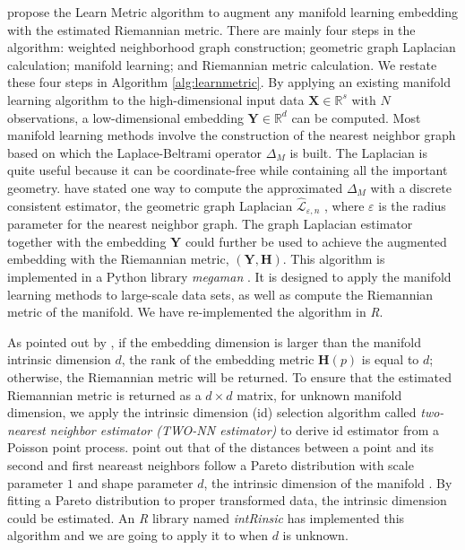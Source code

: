 \documentclass[11pt,a4paper,]{article}
\begin{document}
\textcite{Perrault-Joncas2013-pq} propose the Learn Metric algorithm to augment any manifold learning embedding with the estimated Riemannian metric. There are mainly four steps in the algorithm: weighted neighborhood graph construction; geometric graph Laplacian calculation; manifold learning; and Riemannian metric calculation. We restate these four steps in Algorithm \ref{alg:learnmetric}.
By applying an existing manifold learning algorithm to the high-dimensional input data \(\pmb{X}\in \mathbb{R}^s\) with \(N\) observations, a low-dimensional embedding \(\pmb{Y} \in \mathbb{R}^d\) can be computed. Most manifold learning methods involve the construction of the nearest neighbor graph based on which the Laplace-Beltrami operator \(\Delta_M\) is built. The Laplacian is quite useful because it can be coordinate-free while containing all the important geometry.
\textcite{Perrault-Joncas2013-pq} have stated one way to compute the approximated \(\Delta_M\) with a discrete consistent estimator, the geometric graph Laplacian \(\hat{\mathcal{L}}_{\varepsilon,n}\) \autocite{Zhou2011-za}, where \(\varepsilon\) is the radius parameter for the nearest neighbor graph.
The graph Laplacian estimator together with the embedding \(\pmb{Y}\) could further be used to achieve the augmented embedding with the Riemannian metric, \((\pmb{Y}, \pmb{H})\).
This algorithm is implemented in a Python library \emph{megaman} \autocite{McQueen2016-xz}. It is designed to apply the manifold learning methods to large-scale data sets, as well as compute the Riemannian metric of the manifold. We have re-implemented the algorithm in \emph{R}.

As pointed out by \textcite{Perrault-Joncas2013-pq}, if the embedding dimension is larger than the manifold intrinsic dimension \(d\), the rank of the embedding metric \(\pmb{H}(p)\) is equal to \(d\); otherwise, the Riemannian metric will be returned.
To ensure that the estimated Riemannian metric is returned as a \(d\times d\) matrix, for unknown manifold dimension, we apply the intrinsic dimension (id) selection algorithm called \emph{two-nearest neighbor estimator (TWO-NN estimator)} \autocite{Facco2017-rl,Denti2021-jl} to derive id estimator from a Poisson point process. \textcite{Facco2017-rl} point out that of the distances between a point and its second and first neareast neighbors follow a Pareto distribution with scale parameter \(1\) and shape parameter \(d\), the intrinsic dimension of the manifold \autocite{Facco2017-rl}. By fitting a Pareto distribution to proper transformed data, the intrinsic dimension could be estimated. An \emph{R} library named \emph{intRinsic} \autocite{Denti2021-qc} has implemented this algorithm and we are going to apply it to when \(d\) is unknown.
\end{document}
